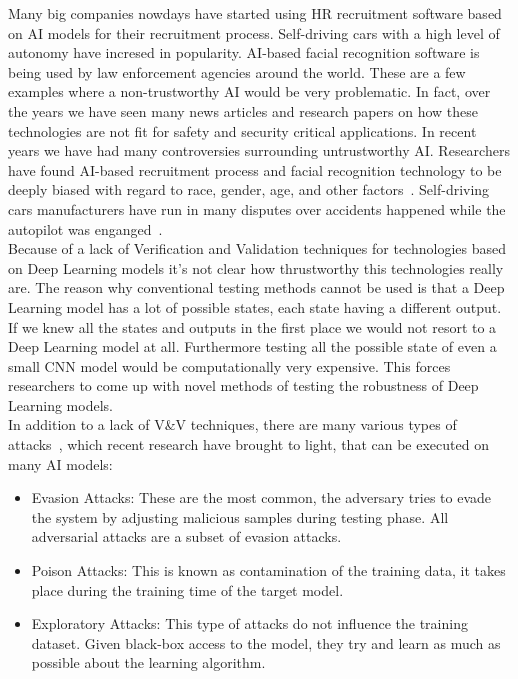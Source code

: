 \documentclass[a4paper]{article}
\begin{document}
Many big companies nowdays have started using HR recruitment software based on AI models for their recruitment process. Self-driving cars with a high level of autonomy have incresed in popularity. AI-based facial recognition software is being used by law enforcement agencies around the world. These are a few examples where a non-trustworthy AI would be very problematic. In fact, over the years we have seen many news articles and research papers on how these technologies are not fit for safety and security critical applications.
In recent years we have had many controversies surrounding untrustworthy AI\@. Researchers have found AI-based recruitment process and facial recognition technology to be deeply biased with regard to race, gender, age, and other factors~\cite{marks2021can}. Self-driving cars manufacturers have run in many disputes over accidents happened while the autopilot was enganged~\cite{kohli2020enabling}.\\
Because of a lack of Verification and Validation techniques for technologies based on Deep Learning models it's not clear how thrustworthy this technologies really are. The reason why conventional testing methods cannot be used is that a Deep Learning model has a lot of possible states, each state having a different output. If we knew all the states and outputs in the first place we would not resort to a Deep Learning model at all. Furthermore testing all the possible state of even a small CNN model would be computationally very expensive. This forces researchers to come up with novel methods of testing the robustness of Deep Learning models.\\
In addition to a lack of V\&V techniques, there are many various types of attacks~\cite{chakraborty2018}, which recent research have brought to light, that can be executed on many AI models: 
\begin{itemize}
    \item Evasion Attacks: These are the most common, the adversary tries to evade the system by adjusting malicious samples during testing phase. All adversarial attacks are a subset of evasion attacks.
    \item Poison Attacks: This is known as contamination of the training data, it takes place during the training time of the target model.
    \item Exploratory Attacks: This type of attacks do not influence the training dataset. Given black-box access to the model, they try and learn as much as possible about the learning algorithm.
\end{itemize}
\end{document}
